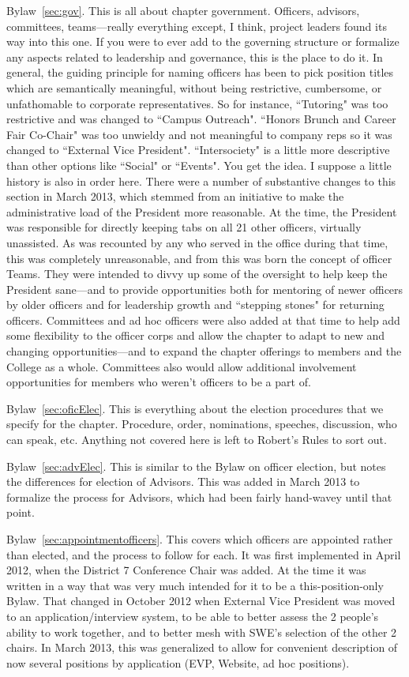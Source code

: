 \begin{preface}
Bylaw~\ref{sec:gov}.
This is all about chapter government.
Officers, advisors, committees, teams---really everything except, I think, project leaders found its way into this one.
If you were to ever add to the governing structure or formalize any aspects related to leadership and governance, this is the place to do it.
In general, the guiding principle for naming officers has been to pick position titles which are semantically meaningful, without being restrictive, cumbersome, or unfathomable to corporate representatives.
So for instance, ``Tutoring" was too restrictive and was changed to ``Campus Outreach".
``Honors Brunch and Career Fair Co-Chair" was too unwieldy and not meaningful to company reps so it was changed to ``External Vice President".
``Intersociety" is a little more descriptive than other options like ``Social" or ``Events".
You get the idea.
I suppose a little history is also in order here.
There were a number of substantive changes to this section in March 2013, which stemmed from an initiative to make the administrative load of the President more reasonable.
At the time, the President was responsible for directly keeping tabs on all 21 other officers, virtually unassisted.
As was recounted by any who served in the office during that time, this was completely unreasonable, and from this was born the concept of officer Teams.
They were intended to divvy up some of the oversight to help keep the President sane---and to provide opportunities both for mentoring of newer officers by older officers and for leadership growth and ``stepping stones" for returning officers.
Committees and ad hoc officers were also added at that time to help add some flexibility to the officer corps and allow the chapter to adapt to new and changing opportunities---and to expand the chapter offerings to members and the College as a whole.
Committees also would allow additional involvement opportunities for members who weren't officers to be a part of.

Bylaw~\ref{sec:oficElec}.
This is everything about the election procedures that we specify for the chapter.
Procedure, order, nominations, speeches, discussion, who can speak, etc. Anything not covered here is left to Robert's Rules to sort out.

Bylaw~\ref{sec:advElec}.
This is similar to the Bylaw on officer election, but notes the differences for election of Advisors.
This was added in March 2013 to formalize the process for Advisors, which had been fairly hand-wavey until that point.

Bylaw~\ref{sec:appointmentofficers}.
This covers which officers are appointed rather than elected, and the process to follow for each.
It was first implemented in April 2012, when the District 7 Conference Chair was added.
At the time it was written in a way that was very much intended for it to be a this-position-only Bylaw.
That changed in October 2012 when External Vice President was moved to an application/interview system, to be able to better assess the 2 people's ability to work together, and to better mesh with SWE's selection of the other 2 chairs.
In March 2013, this was generalized to allow for convenient description of now several positions by application (EVP, Website, ad hoc positions).


\end{preface}
